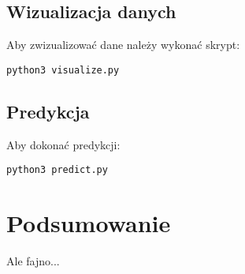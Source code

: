 \documentclass[a4paper,12pt]{mwart}
\begin{document}
\subsection{Wizualizacja danych}
Aby zwizualizować dane należy wykonać skrypt:
\begin{lstlisting}
python3 visualize.py
\end{lstlisting}

\subsection{Predykcja}
Aby dokonać predykcji:
\begin{lstlisting}
python3 predict.py
\end{lstlisting}

\section{Podsumowanie}
Ale fajno...
\end{document}
